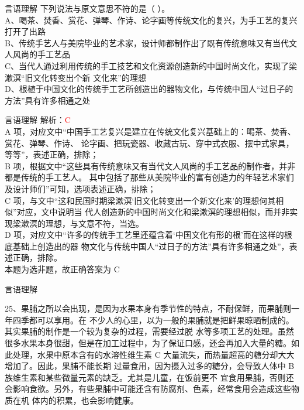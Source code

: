 \documentclass[aspectratio=169]{beamer}
\begin{document}
\begin{frame}[t]{言语理解}
    下列说法与原文意思不符的是（ ）。\\
    A、喝茶、焚香、赏花、弹琴、作诗、论字画等传统文化的复兴，为手工艺的复兴打开了出路\\
    B、传统手艺人与美院毕业的艺术家，设计师都制作出了既有传统意味又有当代文人风尚的手工艺品\\
    C、当代人通过利用传统的手工技艺和文化资源创造新的中国时尚文化，实现了梁漱溟“旧文化转变出个新
    文化来”的理想\\
    D、根植于中国文化的传统手工艺所创造出的器物文化，与传统中国人“过日子的方法”具有许多相通之处\\

\end{frame}



\begin{frame}[t]{言语理解}
    解析：\textcolor{red}{C}\\
    A 项，对应文中“中国手工艺复兴是建立在传统文化复兴基础上的：喝茶、焚香、赏花、弹琴、作诗、
    论字画、把玩瓷器、收藏古玩、穿中式衣服、摆中式家具，等等”，表述正确，排除；\\
    B 项，根据文中“这些具有传统意味又有当代文人风尚的手工艺品的制作者，并非都是传统的手工艺人。
    其中包括了那些从美院毕业的富有创造力的年轻艺术家们及设计师们”可知，选项表述正确，排除；\\
    C 项，与文中“这和民国时期梁漱溟‘旧文化转变出一个新文化来’的理想何其相似”对应，文中说明当
    代人创造新的中国时尚文化和梁漱溟的理想相似，而并非实现梁漱溟的理想，与文意不符，当选。\\
    D 项，对应文中“许多的传统手工艺里还蕴含着‘中国文化有形的根’而在这样的根底基础上创造出的器
    物文化与传统中国人“过日子的方法”具有许多相通之处”，表述正确，排除。\\
    本题为选非题，故正确答案为 C\\
\end{frame}






\begin{frame}[t]{言语理解}

    25、果脯之所以会出现，是因为水果本身有季节性的特点，不耐保鲜，而果脯则一年四季都可以享用。在
    不少人的心里，以为一般的果脯就是把鲜果晾晒制成的。其实果脯的制作是一个较为复杂的过程，需要经过脱
    水等多项工艺的处理。虽然很多水果本身很甜，但是在加工过程中，为了保证口感，还会再加入大量的糖。如
    此处理，水果中原本含有的水溶性维生素 C 大量流失，而热量超高的糖分却大大增加了。因此，果脯不能长期
    过量食用，因为摄入过多的糖分，会导致人体中 B 族维生素和某些微量元素的缺乏。尤其是儿童，在饭前更不
    宜食用果脯，否则还会影响食欲。另外，有些果脯中可能还含有防腐剂、色素，经常食用会造成这些物质在机
    体内的积累，也会影响健康。\\
\end{frame}
\end{document}
